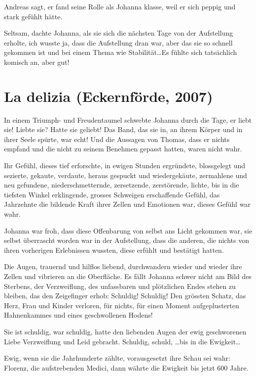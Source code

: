 \documentclass[10pt,titlepage,a5paper]{book}
\begin{document}
Andreas sagt, er fand seine Rolle als Johanna klasse, weil er sich peppig und stark gefühlt hätte.

Seltsam, dachte Johanna, als sie sich die nächsten Tage von der Aufstellung erholte, ich wusste ja, dass die Aufstellung dran war, aber das sie so schnell gekommen ist und bei einem Thema wie Stabilität\dots  Es fühlte sich tatsächlich komisch an, aber gut!



\section*{La delizia (Eckernförde, 2007)}




In einem Triumph- und Freudentaumel schwebte Johanna durch die Tage, er liebt sie! Liebte sie? Hatte sie geliebt! Das Band, das sie in, an ihrem Körper und in ihrer Seele spürte, war echt! Und die Aussagen von Thomas, dass er nichts empfand und die nicht zu seinem Benehmen gepasst hatten, waren nicht wahr.

Ihr Gefühl, dieses tief erforschte, in ewigen Stunden ergründete, blossgelegt und sezierte, gekaute, verdaute, heraus gespuckt und wiedergekäute, zermahlene und neu gefundene, niederschmetternde, zersetzende, zerstörende, lichte, bis in die tiefsten Winkel erklingende, grosses Schweigen erschaffende Gefühl, das Jahrzehnte die bildende Kraft ihrer Zellen und Emotionen war, dieses Gefühl war wahr.

Johanna war froh, dass diese Offenbarung von selbst ans Licht gekommen war, sie selbst überrascht worden war in der Aufstellung, dass die anderen, die nichts von ihren vorherigen Erlebnissen wussten, diese erfühlt und bestätigt hatten.

Die Augen, trauernd und hilflos liebend, durchwandern wieder und wieder ihre Zellen und vibrieren an die Oberfläche.
Es fällt Johanna schwer nicht am Bild des Sterbens, der Verzweiflung, des unfassbaren und plötzlichen Endes stehen zu bleiben, das den Zeigefinger erhob: Schuldig! Schuldig! Den grössten Schatz, das Herz, Frau und Kinder verloren, für nichts, für einen Moment aufgeplusterten Hahnenkammes und eines geschwollenen Hodens!

Sie ist schuldig, war schuldig, hatte den liebenden Augen der ewig geschworenen Liebe  Verzweiflung und Leid gebracht. Schuldig, schuld, \dots bis in die Ewigkeit\dots 

Ewig, wenn sie die Jahrhunderte zählte, vorausgesetzt ihre Schau sei wahr: Florenz, die aufstrebenden Medici, dann währte die Ewigkeit bis jetzt 600 Jahre.
\end{document}
